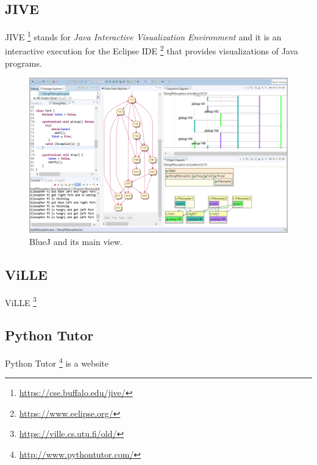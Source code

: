 \documentclass[]{usiinfbachelorproject}
\begin{document}
\vspace{\fill}
\pagebreak

\subsection{JIVE}

JIVE \footnote{\url{https://cse.buffalo.edu/jive/}} stands for \emph{Java Interactive Visualization Environment} and it is an interactive execution for the Eclipse IDE \footnote{\url{https://www.eclipse.org/}} that provides visualizations of Java programs.

\begin{figure}[h]
\centering
\includegraphics[width=\textwidth]{figures/jive.png}
\caption {BlueJ and its main view.}
\end{figure}

\subsection{ViLLE}

ViLLE \footnote{\url{https://ville.cs.utu.fi/old/}}

\subsection{Python Tutor}

Python Tutor \footnote{\url{http://www.pythontutor.com/}} is a website
\end{document}
